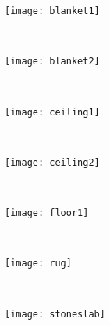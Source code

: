 \begin{figure}[!ht]
    
    \begin{subfigure}[b]{0.12\textwidth}
		\centering
		\texttt{[image: blanket1]}	
	\end{subfigure}
	~ %
    \begin{subfigure}[b]{0.12\textwidth}
		\centering
		\texttt{[image: blanket2]}	
	\end{subfigure}
    ~ %
    \begin{subfigure}[b]{0.12\textwidth}
		\centering
		\texttt{[image: ceiling1]}	
	\end{subfigure}
	~ %
    \begin{subfigure}[b]{0.12\textwidth}
		\centering
		\texttt{[image: ceiling2]}	
	\end{subfigure}
    ~ %
    \begin{subfigure}[b]{0.12\textwidth}
		\centering
		\texttt{[image: floor1]}	
	\end{subfigure}
    ~ %
    \begin{subfigure}[b]{0.12\textwidth}
		\centering
		\texttt{[image: rug]}	
	\end{subfigure}
    ~ %
    \begin{subfigure}[b]{0.12\textwidth}
		\centering
		\texttt{[image: stoneslab]}	
	\end{subfigure} \\[2ex]
    

\end{figure}
